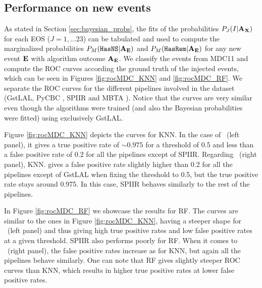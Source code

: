 \subsection{Performance on new events}

As stated in Section \ref{sec:bayesian_probs}, the fits of the probabilities $P_J(I|{\bf A}_{\bf X})$ for each EOS ($J=1,\dots 23$) can be tabulated and used to compute the marginalized probabilities $P_M({{\tt HasNS}}|{\bf A}_{\bf E})$ and $P_M({{\tt HasRem}}|{\bf A}_{\bf E})$ for any new event $\bf E$ with algorithm outcome $\bf A_{E}$.  We classify the events from MDC11  and compute the ROC curves according the ground truth of the injected events, which can be seen in Figures \ref{fig:rocMDC_KNN} and \ref{fig:rocMDC_RF}. We separate the ROC curves for the different pipelines involved in the dataset (GstLAL,  PyCBC \cite{pycbc:2016},  SPIIR \cite{spiir:2020} and MBTA \cite{mbta:2016}). Notice that the curves are very similar even though the algorithms were trained (and also the Bayesian probabilities were fitted) using exclusively GstLAL.

Figure \ref{fig:rocMDC_KNN} depicts the curves for \ac{KNN}.  In the case of \hasns\ (left panel), it gives a true positive rate of $\sim 0.975$ for a threshold of 0.5 and less than a false positive rate of 0.2 for all the pipelines except of SPIIR.  Regarding \hasrem\ (right panel), \ac{KNN}. gives a false positive rate slightly higher than 0.2 for all the pipelines except of GstLAL when fixing the threshold to 0.5, but the true positive rate stays around 0.975. In this case, SPIIR behaves similarly to the rest of the pipelines.  

In Figure \ref{fig:rocMDC_RF} we showcase the results for \ac{RF}.  The curves are similar to the ones in Figure \ref{fig:rocMDC_KNN}, having a steeper shape for \hasns\ (left panel) and thus giving high true positive rates and low false positive rates at a given threshold. SPIIR also performs poorly for \ac{RF}. When it comes to \hasrem\ (right panel), the false positive rates increase as for \ac{KNN}, but again all the pipelines behave similarly. One can note that \ac{RF} gives slightly steeper ROC curves than \ac{KNN},  which results in higher true positive rates at lower false positive rates. 

\begin{comment}
performs very well for \hasns achieving a true positive rate very close to unity with a very small false positive rate. We observe that spiir pipeline deviates from the good behaviour. For \hasrem the overall performance is slightly worse, getting higher false positive rate, but in turn all pipelines behave equally good. In figure \ref{fig:rocMDC_RF} we showcase the results for \ac{RF}. As with \ac{KNN} the results are very good, with steep ROC curves. For \hasns spiir pipeline deviates less from the rest, getting higher positive rates for the same false positives than with \ac{KNN}. In the case of \hasrem the curves of the different pipelines behave a bit more differently from each other.
\end{comment}

